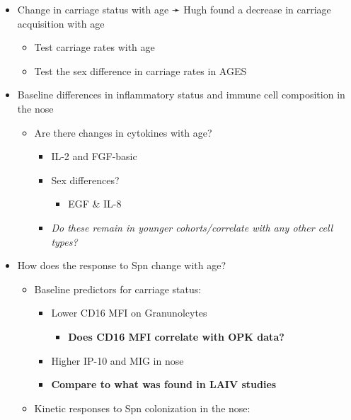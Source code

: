 \documentclass[
]{book}
\providecommand{\tightlist}{%
  \setlength{\itemsep}{0pt}\setlength{\parskip}{0pt}}
\begin{document}
\begin{itemize}
\item
  Change in carriage status with age ➛ Hugh found a decrease in carriage acquisition with age

  \begin{itemize}
  \item
    Test carriage rates with age
  \item
    Test the sex difference in carriage rates in AGES
  \end{itemize}
\item
  Baseline differences in inflammatory status and immune cell composition in the nose

  \begin{itemize}
  \item
    Are there changes in cytokines with age?

    \begin{itemize}
    \item
      IL-2 and FGF-basic
    \item
      Sex differences?

      \begin{itemize}
      \tightlist
      \item
        EGF \& IL-8
      \end{itemize}
    \item
      \emph{Do these remain in younger cohorts/correlate with any other cell types?}
    \end{itemize}
  \end{itemize}
\item
  How does the response to Spn change with age?

  \begin{itemize}
  \item
    Baseline predictors for carriage status:

    \begin{itemize}
    \item
      Lower CD16 MFI on Granunolcytes

      \begin{itemize}
      \tightlist
      \item
        \textbf{Does CD16 MFI correlate with OPK data?}
      \end{itemize}
    \item
      Higher IP-10 and MIG in nose
    \item
      \textbf{Compare to what was found in LAIV studies}
    \end{itemize}
  \item
    Kinetic responses to Spn colonization in the nose:


\end{itemize}
\end{itemize}
\end{document}
